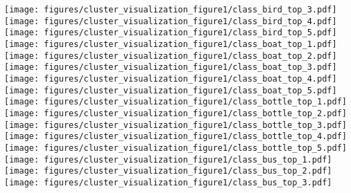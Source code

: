 \documentclass{article}
\begin{document}
\begin{figure*}[htbp]
\texttt{[image: figures/cluster\_visualization\_figure1/class\_bird\_top\_3.pdf]}\hspace{-0.12cm}
\texttt{[image: figures/cluster\_visualization\_figure1/class\_bird\_top\_4.pdf]}\hspace{-0.12cm}
\texttt{[image: figures/cluster\_visualization\_figure1/class\_bird\_top\_5.pdf]}\hspace{0.2cm}
\texttt{[image: figures/cluster\_visualization\_figure1/class\_boat\_top\_1.pdf]}\hspace{-0.12cm}
\texttt{[image: figures/cluster\_visualization\_figure1/class\_boat\_top\_2.pdf]}\hspace{-0.12cm}
\texttt{[image: figures/cluster\_visualization\_figure1/class\_boat\_top\_3.pdf]}\hspace{-0.12cm}
\texttt{[image: figures/cluster\_visualization\_figure1/class\_boat\_top\_4.pdf]}\hspace{-0.12cm}
\texttt{[image: figures/cluster\_visualization\_figure1/class\_boat\_top\_5.pdf]}\vspace{0.2cm}\\
\texttt{[image: figures/cluster\_visualization\_figure1/class\_bottle\_top\_1.pdf]}\hspace{-0.12cm}
\texttt{[image: figures/cluster\_visualization\_figure1/class\_bottle\_top\_2.pdf]}\hspace{-0.12cm}
\texttt{[image: figures/cluster\_visualization\_figure1/class\_bottle\_top\_3.pdf]}\hspace{-0.12cm}
\texttt{[image: figures/cluster\_visualization\_figure1/class\_bottle\_top\_4.pdf]}\hspace{-0.12cm}
\texttt{[image: figures/cluster\_visualization\_figure1/class\_bottle\_top\_5.pdf]}\hspace{0.2cm}
\texttt{[image: figures/cluster\_visualization\_figure1/class\_bus\_top\_1.pdf]}\hspace{-0.12cm}
\texttt{[image: figures/cluster\_visualization\_figure1/class\_bus\_top\_2.pdf]}\hspace{-0.12cm}
\texttt{[image: figures/cluster\_visualization\_figure1/class\_bus\_top\_3.pdf]}\hspace{-0.12cm}

\end{figure*}
\end{document}
